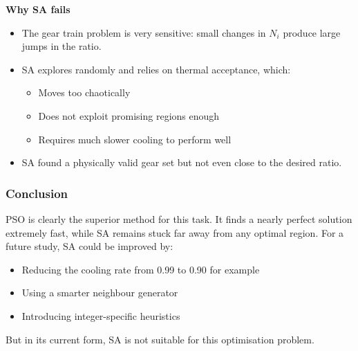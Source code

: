 \textbf{Why SA fails}
\begin{itemize}
    \item The gear train problem is very sensitive: small changes in $N_i$ produce large jumps in the ratio.
    \item SA explores randomly and relies on thermal acceptance, which:
    \begin{itemize}
        \item Moves too chaotically
        \item Does not exploit promising regions enough
        \item Requires much slower cooling to perform well
    \end{itemize}
    \item SA found a physically valid gear set but not even close to the desired ratio.
\end{itemize}

\subsubsection{Conclusion}
PSO is clearly the superior method for this task. It finds a nearly perfect solution extremely fast, while SA remains stuck far away from any optimal region.
For a future study, SA could be improved by:
\begin{itemize}
    \item Reducing the cooling rate from 0.99 to 0.90 for example
    \item Using a smarter neighbour generator
    \item Introducing integer-specific heuristics
\end{itemize}
But in its current form, SA is not suitable for this optimisation problem.
